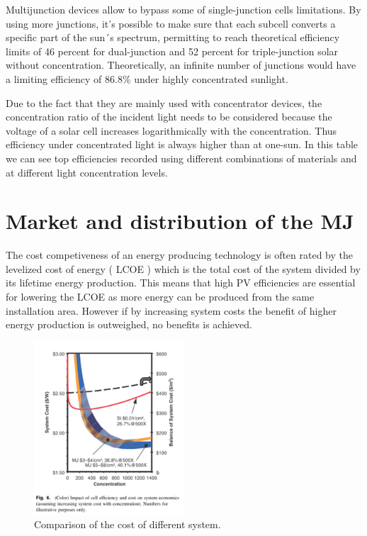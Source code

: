 \documentclass[11pt]{article} %
\begin{document}
Multijunction devices allow to bypass some of single-junction cells limitations. By using more junctions, it's possible to make sure that each subcell converts a specific part of the sun´s spectrum, permitting to reach theoretical efficiency limits of 46 percent for dual-junction and 52 percent for triple-junction solar without concentration. Theoretically, an infinite number of junctions would have a limiting efficiency of 86.8\% under highly concentrated sunlight.

Due to the fact that they are mainly used with concentrator devices, the concentration ratio of the incident light needs to be considered because the voltage of a solar cell increases logarithmically with the  concentration. Thus efficiency  under  concentrated  light is  always  higher  than  at one-sun. In this table we can see top efficiencies  recorded using different combinations of materials and at different light concentration levels.


\section{Market and distribution of the MJ}

The cost competiveness of an energy producing technology is often rated by the levelized cost of energy ( LCOE )  which is  the  total  cost  of  the  system  divided  by  its  lifetime  energy production. This means that high PV efficiencies  are  essential  for lowering  the  LCOE  as  more  energy can  be produced from the same installation area. However if by increasing system costs the  benefit  of  higher  energy  production is outweighed, no benefits is achieved.   


\begin{figure}
	\centering
	\includegraphics[width=0.5\textwidth]{img/sadasd.png}
	\caption{Comparison of the cost of different system.}
	\vspace{-10pt}
\end{figure}
 
\end{document}
